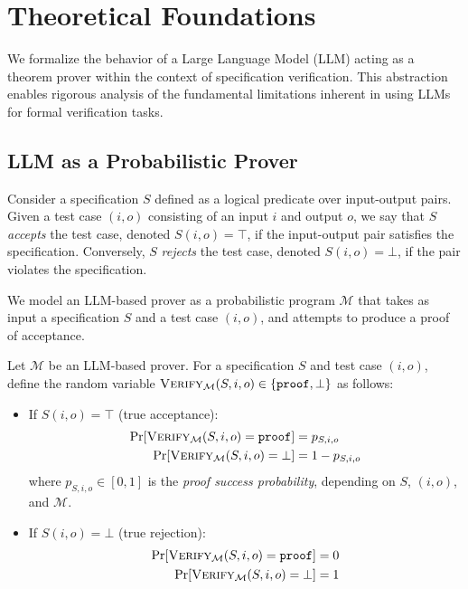 \section{Theoretical Foundations}
\label{appendix:theory}

\newcommand{\passmark}{\mathcal{P}_{\text{all}}}
\newcommand{\rejectmark}{\mathcal{R}_{\text{all}}}

We formalize the behavior of a Large Language Model (LLM) acting as a theorem prover within the context of specification verification. This abstraction enables rigorous analysis of the fundamental limitations inherent in using LLMs for formal verification tasks.

\subsection{LLM as a Probabilistic Prover}
\label{appendix:llm-model}

Consider a specification $S$ defined as a logical predicate over input-output pairs. Given a test case $(i, o)$ consisting of an input $i$ and output $o$, we say that $S$ \emph{accepts} the test case, denoted $S(i, o) = \top$, if the input-output pair satisfies the specification. Conversely, $S$ \emph{rejects} the test case, denoted $S(i, o) = \bot$, if the pair violates the specification.

We model an LLM-based prover as a probabilistic program $\mathcal{M}$ that takes as input a specification $S$ and a test case $(i, o)$, and attempts to produce a proof of acceptance.

\begin{definition}
\label{def:llm-oracle}
Let $\mathcal{M}$ be an LLM-based prover. For a specification $S$ and test case $(i, o)$, define the random variable $\textsc{Verify}_{\mathcal{M}}(S, i, o) \in \{\texttt{proof}, \bot\}$ as follows:
\begin{itemize}[leftmargin=1.5em, itemsep=4pt, topsep=4pt]
    \item If $S(i, o) = \top$ (true acceptance):
    \begin{align}
    \Pr[\textsc{Verify}_{\mathcal{M}}(S, i, o) = \texttt{proof}] &= p_{S,i,o} \\
    \Pr[\textsc{Verify}_{\mathcal{M}}(S, i, o) = \bot] &= 1 - p_{S,i,o}
    \end{align}
    where $p_{S,i,o} \in [0, 1]$ is the \emph{proof success probability}, depending on $S$, $(i, o)$, and $\mathcal{M}$.
    \item If $S(i, o) = \bot$ (true rejection):
    \begin{align}
    \Pr[\textsc{Verify}_{\mathcal{M}}(S, i, o) = \texttt{proof}] &= 0 \\
    \Pr[\textsc{Verify}_{\mathcal{M}}(S, i, o) = \bot] &= 1
    \end{align}
\end{itemize}
\end{definition}

